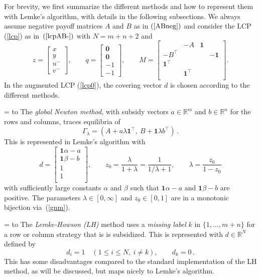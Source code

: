 \documentclass[a4paper,12pt]{article}  %
\def\rmitem#1{\par\hangafter=1\hangindent=\einr
  \noindent\hbox to\einr{\ignorespaces#1\hfill}\ignorespaces}
\newcommand\bullitem{\rmitem{\raise.17ex\hbox{\kern7pt\scriptsize$\bullet$}}}
\theoremstyle{definition}
\def\reals{{\mathbb R}}
\newcommand{\T}{^{\top}}
\newcommand{\0}{{\mathbf0}}
\newcommand{\1}{{\mathbf1}}
\begin{document}
For brevity, we first summarize the different methods and how to
represent them with Lemke's algorithm, with details in the
following subsections.
We always assume negative payoff matrices $A$ and $B$ as in
$(\ref{ABneg})$ and consider the LCP (\ref{lcp}) as
in~$(\ref{lcpAB-})$ with $N=m+n+2$ and
\begin{equation}
\label{tlcp}
z=\left[\begin{matrix}x\\y\\ u^-\\v^-
\end{matrix}\right],\qquad
q=\left[\begin{matrix}\0\\ \0\\  -1\\-1
\end{matrix}\right],\qquad 
M=\left[\begin{matrix}
&-A&\1\\
-B\T&&&-\1\\
\1\T &\\
&\1\T\\
\end{matrix}\right].
\end{equation}
In the augmented LCP (\ref{lcp0}), the covering vector $d$
is chosen according to the different methods.
\bullitem
The \textit{global Newton method}, with subsidy vectors
$a\in\reals^m$ and $b\in\reals^n$ for the rows and columns,
traces equilibria of 
\begin{equation}
\label{ABl}
\Gamma_\lambda=(A + a\lambda\1\T, ~B+\1\lambda b\T)\,.
\end{equation}
This is represented in Lemke's algorithm with
\begin{equation}
\label{gnm}
d=\left[\begin{matrix} \1\alpha-a\\ \1\beta-b\\1\\1\\
\end{matrix}\right]
,\qquad 
z_0=\frac{\lambda}{1+\lambda}=\frac{1}{1/\lambda+1}
,\qquad 
\lambda = \frac{z_0}{1-z_0}
\end{equation}
with sufficiently large constants $\alpha$ and $\beta$ such
that $\1\alpha-a$ and $\1\beta-b$ are positive.
The parameters $\lambda\in[0,\infty]$ and $z_0\in[0,1]$ are
in a monotonic bijection via~(\ref{gnm}).

\bullitem
The \textit{Lemke-Howson (LH)} method uses a \textit{missing
label} $k$ in $\{1,\ldots,m+n\}$ for a row or column
strategy that is is subsidized. 
This is represented with $d\in\reals^N$ defined by
\begin{equation}
\label{LHd}
d_i=1\quad
(1\le i\le N,~i\ne k),\qquad
d_k=0\,.
\end{equation}
This has some disadvantages compared to the standard
implementation of the LH method, as will be discussed, but
maps nicely to Lemke's algorithm.
\end{document}
